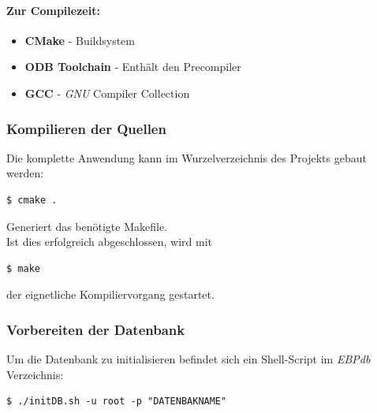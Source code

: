 \paragraph{Zur Compilezeit:}
\begin{itemize}
	\item \textbf{CMake} - Buildsystem
	\item \textbf{ODB Toolchain} - Enthält den Precompiler
	\item \textbf{GCC} - \textit{GNU} Compiler Collection
\end{itemize}
\subsubsection{Kompilieren der Quellen}
Die komplette Anwendung kann im Wurzelverzeichnis des Projekts gebaut werden:\\
\begin{lstlisting}
$ cmake .
\end{lstlisting}
Generiert das benötigte Makefile.\\
Ist dies erfolgreich abgeschlossen, wird mit\\
\begin{lstlisting}
$ make
\end{lstlisting}
der eignetliche Kompiliervorgang gestartet.\\
\subsubsection{Vorbereiten der Datenbank}
Um die Datenbank zu initialisieren befindet sich ein Shell-Script im \textit{EBPdb} Verzeichnis:\\
\begin{lstlisting}
$ ./initDB.sh -u root -p "DATENBAKNAME"
\end{lstlisting}
